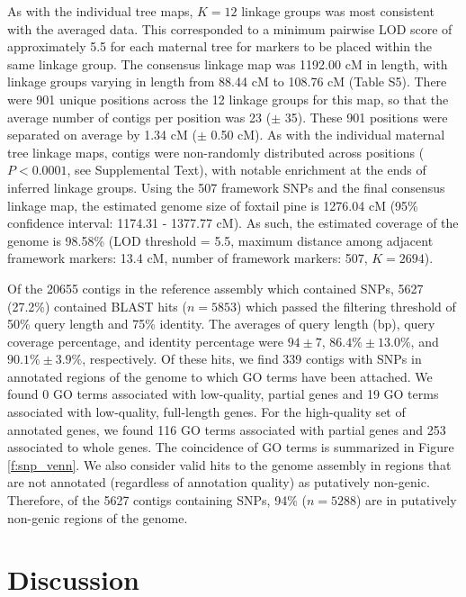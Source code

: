 \documentclass[smallextended]{svjour3}
\begin{document}
As with the individual tree maps, $K = 12$ linkage groups was most consistent
with the averaged data. This corresponded to a minimum pairwise LOD score of
approximately 5.5 for each maternal tree for markers to be placed within the
same linkage group.  The consensus linkage map was 1192.00 cM in length, with
linkage groups varying in length from 88.44 cM to 108.76 cM (Table S5). There
were 901 unique positions across the 12 linkage groups for this map, so that the
average number of contigs per position was 23 ($\pm$ 35). These 901 positions
were separated on average by 1.34 cM ($\pm$ 0.50 cM). As with the individual
maternal tree linkage maps, contigs were non-randomly distributed across
positions ($P < 0.0001$, see Supplemental Text), with notable enrichment at the
ends of inferred linkage groups. Using the 507 framework SNPs and the final
consensus linkage map, the estimated genome size of foxtail pine is 1276.04 cM
(95\% confidence interval: 1174.31 - 1377.77 cM). As such, the estimated
coverage of the genome is 98.58\% (LOD threshold = 5.5, maximum distance among
adjacent framework markers: 13.4 cM, number of framework markers: 507, $K =
2694$).

Of the \num{20655} contigs in the reference assembly which contained SNPs,
\num{5627} (27.2\%) contained BLAST hits ($n=5853$) which passed the filtering
threshold of 50\% query length and 75\% identity.  The averages of query length
(bp), query coverage percentage, and identity percentage were $94 \pm 7$,
$86.4\% \pm 13.0\%$, and $90.1\% \pm 3.9\%$, respectively. Of these hits, we
find 339 contigs with SNPs in annotated regions of the genome to which GO terms
have been attached.  We found 0 GO terms associated with low-quality, partial
genes and 19 GO terms associated with low-quality, full-length genes. For the
high-quality set of annotated genes, we found 116 GO terms associated with
partial genes and 253 associated to whole genes.  The coincidence of GO terms is
summarized in Figure \ref{f:snp_venn}. We also consider valid hits to the genome
assembly in regions that are not annotated (regardless of annotation quality) as
putatively non-genic. Therefore, of the \num{5627} contigs containing SNPs, 94\%
($n=5288$) are in putatively non-genic regions of the genome.



\section*{Discussion}
\end{document}
